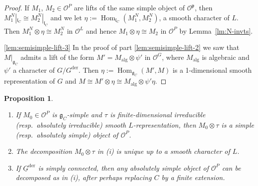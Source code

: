 \documentclass[a4paper]{amsart}
\numberwithin{equation}{section}
\newtheorem{prop}[thm]{Proposition}
\theoremstyle{remark}
\theoremstyle{definition}
\DeclareMathOperator{\Hom}{Hom}
\newcommand{\alggrp}[1]{\underline{#1}}
\newcommand{\der}{\mathrm{der}}
\newcommand{\alg}{\mathrm{alg}}
\begin{document}
\begin{proof}
  If $M_1$, $M_2 \in \mathcal{O}^{P}$ are lifts of the same simple object of $\mathcal{O}^{\mathfrak{p}}$, then $M_1^N|_{\mathfrak{l}_{C}} \cong M_2^N|_{\mathfrak{l}_{C}}$ and we let
  $\eta := \Hom_{\mathfrak{l}_{C}}(M_1^N,M_2^N)$, a smooth character of $L$. Then $M_1^N \otimes \eta \cong M_2^N$ in $\mathcal{O}^{L}$ and hence
  $M_1 \otimes \eta \cong M_2$ in $\mathcal{O}^{P}$ by Lemma~\ref{lm:N-invts}.

  \ref{lem:semisimple-lift-3} In the proof of part \ref{lem:semisimple-lift-2} we saw that $M|_{\mathfrak{g}_{C}}$ admits a lift of the form $M' = M_\alg \otimes \psi'$ in $\mathcal{O}^{G}$, where $M_\alg$ is algebraic
  and $\psi'$ a character of $G/G^{\der}$. Then $\eta := \Hom_{\mathfrak{g}_{C}}(M',M)$ is a 1-dimensional smooth representation of $G$ and
  $M \cong M' \otimes \eta \cong M_\alg \otimes \psi'\eta$.
\end{proof}

\begin{prop}\label{prop:simple-O-P}\ 
  \begin{enumerate}
  \item If $M_0 \in \mathcal{O}^{P}$ is $\mathfrak{g}_{C}$-simple and $\tau$ is finite-dimensional irreducible (resp.\ absolutely irreducible) smooth $L$-representation,
    then $M_0 \otimes \tau$ is a simple (resp.\ absolutely simple) object of $\mathcal{O}^{P}$.
  \item The decomposition $M_0 \otimes \tau$ in (i) is unique up to a smooth character of $L$.
  \item If $\alggrp{G}^{\der}$ is simply connected, then any absolutely simple object of $\mathcal{O}^{P}$ can be decomposed as in (i), after perhaps
    replacing $C$ by a finite extension.
  \end{enumerate}
\end{prop}
\end{document}
